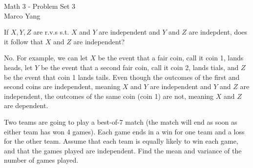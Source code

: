 \documentclass[answers]{exam}
\begin{document}
\begin{center}
{\Large Math 3 - Problem Set 3} \\
\medskip
Marco Yang \\
\bigskip
\end{center}

\begin{questions}
\question[20] If $X,Y,Z$ are r.v.s s.t. $X$ and $Y$ are independent and $Y$ and
$Z$ are indepdent, does it follow that $X$ and $Z$ are independent?

\begin{solution}
No. For example, we can let $X$ be the event that a fair coin, call it coin 1,
lands heads, let $Y$ be the event that a second fair coin, call it coin 2, lands
tials, and $Z$ be the event that coin 1 lands tails. Even though the outcomes of
the first and second coins are independent, meaning $X$ and $Y$ are independent
and $Y$ and $Z$ are independent, the outcomes of the same coin (coin 1) are not,
meaning $X$ and $Z$ are dependent.
\end{solution}

\question[20]

\question[20] Two teams are going to play a best-of-7 match (the match will end
as soon as either team has won 4 games). Each game ends in a win for one team
and a loss for the other team. Assume that each team is equally likely to win
each game, and that the games played are independent. Find the mean and variance
of the number of games played.


\end{questions}
\end{document}
